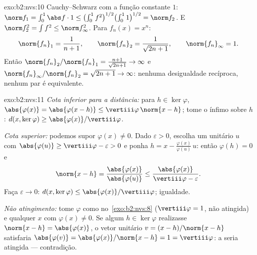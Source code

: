 \begin{solution}{exo:b2:nvs:10}
Cauchy--Schwarz com a função constante $1$: $\norm f_1 =
\int_0^1 \abs f\cdot 1 \leq \bigl(\int_0^1
f^2\bigr)^{1/2}\bigl(\int_0^1 1\bigr)^{1/2} = \norm f_2$. E
$\norm f_2^2 = \int f^2 \leq \norm f_\infty^2$. Para $f_n(x) =
x^n$:
\[
\norm{f_n}_1 = \frac1{n+1}, \qquad
\norm{f_n}_2 = \frac1{\sqrt{2n+1}}, \qquad
\norm{f_n}_\infty = 1 .
\]
Então $\norm{f_n}_2/\norm{f_n}_1 = \frac{n+1}{\sqrt{2n+1}} \to
\infty$ e $\norm{f_n}_\infty/\norm{f_n}_2 = \sqrt{2n+1} \to
\infty$: nenhuma desigualdade recíproca, nenhum par é equivalente.
\end{solution}

\begin{solution}{exo:b2:nvs:11}
\emph{Cota inferior para a distância:} para $h \in \ker\varphi$,
$\abs{\varphi(x)} = \abs{\varphi(x - h)} \leq
\vertiii\varphi\,\norm{x - h}$; tome o ínfimo sobre $h$:
$d(x, \ker\varphi) \geq \abs{\varphi(x)}/\vertiii\varphi$.

\emph{Cota superior:} podemos supor $\varphi(x) \neq 0$. Dado
$\varepsilon > 0$, escolha um unitário $u$ com $\abs{\varphi(u)} \geq
\vertiii\varphi - \varepsilon > 0$ e ponha $h = x -
\frac{\varphi(x)}{\varphi(u)}\,u$: então $\varphi(h) = 0$ e
\[
\norm{x - h} = \frac{\abs{\varphi(x)}}{\abs{\varphi(u)}}
\leq \frac{\abs{\varphi(x)}}{\vertiii\varphi - \varepsilon}.
\]
Faça $\varepsilon \to 0$: $d(x, \ker\varphi) \leq
\abs{\varphi(x)}/\vertiii\varphi$; igualdade.

\emph{Não atingimento:} tome $\varphi$ como no~\cref{exo:b2:nvs:8}
($\vertiii\varphi = 1$, não atingida) e qualquer $x$ com
$\varphi(x) \neq 0$. Se algum $h \in \ker\varphi$ realizasse
$\norm{x - h} = \abs{\varphi(x)}$, o vetor unitário $v = (x -
h)/\norm{x - h}$ satisfaria $\abs{\varphi(v)} =
\abs{\varphi(x)}/\norm{x - h} = 1 = \vertiii\varphi$: a
 seria atingida --- contradição.
\end{solution}

